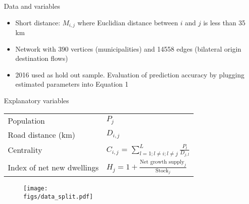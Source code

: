 \documentclass[final, 12pt, aspectratio=169, xcolor={dvipsnames}]{beamer}
\newcommand*{\figs}{../figs}%
\begin{document}
\begin{frame}{Data and variables}
  \begin{minipage}[t]{0.40\linewidth}%
    \footnotesize
    \begin{itemize}
      \item Short distance: $M_{i,j}$ where Euclidian distance between $i$ and $j$ is less than 35 km
      \item Network with 390 vertices (municipalities) and 14558 edges (bilateral origin destination flows)
      \item 2016 used as hold out sample. Evaluation of prediction accuracy by plugging estimated parameters into Equation 1
    \end{itemize}
  \end{minipage}
  \begin{minipage}[t]{0.48\linewidth}%
  \scriptsize
    \begin{table}{Explanatory variables}
      \begin{tabular}{ll}
        \hline
        Population  & $P_{j}$\\
        Road distance (km)    & $D_{i,j}$ \\
        Centrality   & $C_{i, j}$ = $\sum\limits_{l=1; l \ne i; l \ne j}^{L} \frac{P_{l}}{D_{j,l}}$\\
        Index of net new dwellings  & $H_{j} =  1 + \frac{\text{Net growth supply}_{j}}{\text{Stock}_{j}} $ \\
        \hline
        \end{tabular}
    \end{table}
    
    \vspace{-0.6cm}
    
    \begin{figure}
      \flushleft
    \texttt{[image: \\figs/data\_split.pdf]}
  \end{figure}
  \end{minipage}
\end{frame}
\end{document}
